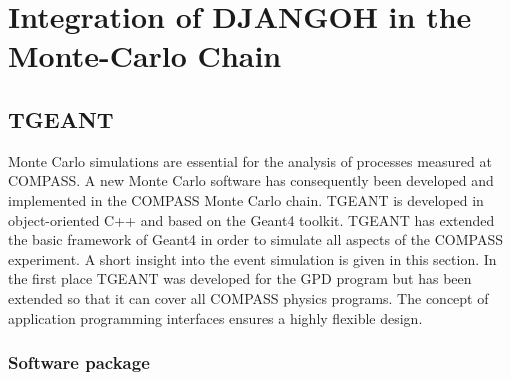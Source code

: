 
\chapter{Integration of DJANGOH in the Monte-Carlo Chain} %

\label{ch:MC} %


\section{TGEANT}

Monte Carlo simulations are essential for the analysis of processes measured at COMPASS. A new Monte Carlo software has consequently been developed and implemented in the COMPASS Monte Carlo chain. TGEANT is developed in object-oriented C++ and based on the Geant4 toolkit. TGEANT has extended the basic framework of Geant4 in order to simulate all aspects of the COMPASS experiment. A short insight into the event simulation is given in this section.
In the first place TGEANT was developed for the GPD program but has been extended so that it can cover all COMPASS physics programs. The concept of application programming interfaces ensures a highly flexible design.

\subsection{Software package}

